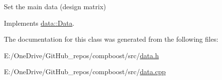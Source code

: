 Set the main data (design matrix) 



Implements \mbox{\hyperlink{classdata_1_1_data_a0e928c49b31f803e7984cc24e2f73f70}{data\+::\+Data}}.



The documentation for this class was generated from the following files\+:\begin{DoxyCompactItemize}
\item 
E\+:/\+One\+Drive/\+Git\+Hub\+\_\+repos/compboost/src/\mbox{\hyperlink{data_8h}{data.\+h}}\item 
E\+:/\+One\+Drive/\+Git\+Hub\+\_\+repos/compboost/src/\mbox{\hyperlink{data_8cpp}{data.\+cpp}}\end{DoxyCompactItemize}

